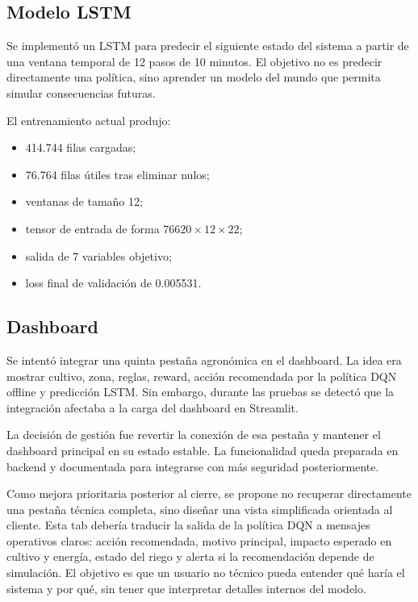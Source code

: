 \documentclass[11pt,a4paper]{article}
\begin{document}
\subsection{Modelo LSTM}

Se implementó un LSTM para predecir el siguiente estado del sistema a partir de una ventana temporal de 12 pasos de 10 minutos. El objetivo no es predecir directamente una política, sino aprender un modelo del mundo que permita simular consecuencias futuras.

El entrenamiento actual produjo:

\begin{itemize}
    \item 414.744 filas cargadas;
    \item 76.764 filas útiles tras eliminar nulos;
    \item ventanas de tamaño 12;
    \item tensor de entrada de forma \(76620 \times 12 \times 22\);
    \item salida de 7 variables objetivo;
    \item loss final de validación de 0.005531.
\end{itemize}

\subsection{Dashboard}

Se intentó integrar una quinta pestaña agronómica en el dashboard. La idea era mostrar cultivo, zona, reglas, reward, acción recomendada por la política DQN offline y predicción LSTM. Sin embargo, durante las pruebas se detectó que la integración afectaba a la carga del dashboard en Streamlit.

La decisión de gestión fue revertir la conexión de esa pestaña y mantener el dashboard principal en su estado estable. La funcionalidad queda preparada en backend y documentada para integrarse con más seguridad posteriormente.

Como mejora prioritaria posterior al cierre, se propone no recuperar directamente una pestaña técnica completa, sino diseñar una vista simplificada orientada al cliente. Esta tab debería traducir la salida de la política DQN a mensajes operativos claros: acción recomendada, motivo principal, impacto esperado en cultivo y energía, estado del riego y alerta si la recomendación depende de simulación. El objetivo es que un usuario no técnico pueda entender qué haría el sistema y por qué, sin tener que interpretar detalles internos del modelo.
\end{document}
